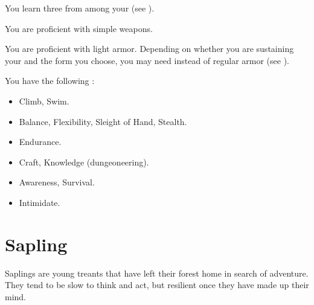       You learn three  from among your  (see ).

      You are proficient with simple weapons.

      You are proficient with light armor.
      Depending on whether you are sustaining your  and the form you choose, you may need  instead of regular armor (see ).

      You have the following :
      \begin{itemize}
        \item {} Climb, Swim.
        \item {} Balance, Flexibility, Sleight of Hand, Stealth.
        \item {} Endurance.
        \item {} Craft, Knowledge (dungeoneering).
        \item {} Awareness, Survival.
        \item {} Intimidate.
      \end{itemize}

\section{Sapling}

  Saplings are young treants that have left their forest home in search of adventure.
  They tend to be slow to think and act, but resilient once they have made up their mind.

